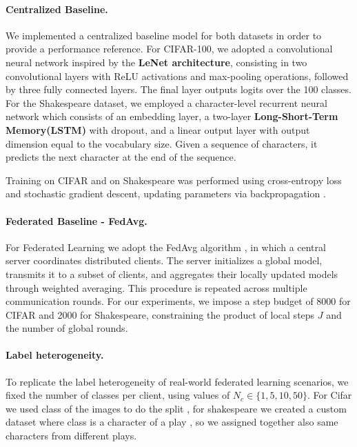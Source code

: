 \documentclass[10pt,twocolumn,letterpaper]{article}
\begin{document}
\paragraph{Centralized Baseline.}
We implemented a centralized baseline model for both datasets in order to provide a performance
 reference. 
For CIFAR-100, we adopted a convolutional neural network inspired by the \textbf{LeNet architecture}, consisting in two convolutional layers with ReLU activations and max-pooling operations,
 followed by three fully connected layers. The final layer outputs logits over the 100 classes.
For the Shakespeare dataset, we employed a character-level recurrent neural network which consists of an embedding layer, a two-layer \textbf{Long-Short-Term Memory(LSTM)} with dropout, and a linear output layer with output dimension equal to the vocabulary size. Given a sequence of characters, it predicts the next character at the end of the sequence.

 Training on CIFAR  and on Shakespeare was performed using cross-entropy loss and stochastic gradient descent,
updating parameters via backpropagation .






\paragraph{Federated Baseline - FedAvg.}
For Federated Learning we adopt the FedAvg algorithm \cite{mcmahan2017communication} , in which a central server coordinates distributed clients. The server initializes a global model, transmits it to a subset of clients, and aggregates their locally updated models through weighted averaging. This procedure is repeated across multiple communication rounds. For our experiments, we impose a step budget of 8000 for CIFAR and 2000 for Shakespeare, constraining the product of local steps \(J\) and the number of global rounds.

\paragraph{Label heterogeneity.} To replicate the label heterogeneity of real-world federated learning scenarios, we fixed the number of classes per client, using values of $N_c \in \{1,5,10,50\}$. For Cifar we used class of the images to do the split , for shakespeare we created a custom dataset where class is a character of a play , so we assigned together also same characters from different plays. 
\end{document}
